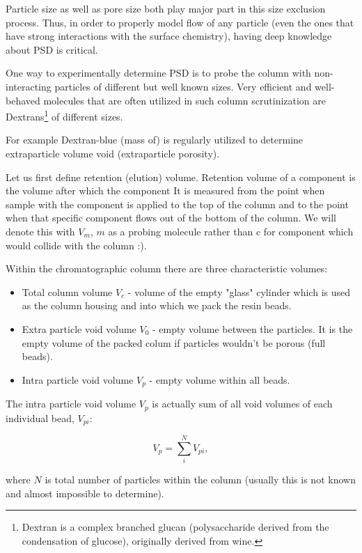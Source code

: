 Particle size as well as pore size both play major part in this size exclusion
process. Thus, in order to properly model flow of any particle (even the ones
that have strong interactions with the surface chemistry), having deep
knowledge about PSD is critical.

One way to experimentally determine PSD is to probe the column with
non-interacting particles of different but well known sizes. Very efficient and
well-behaved molecules that are often utilized in such column scrutinization
are Dextrans\footnote{Dextran is a complex branched glucan (polysaccharide
    derived from the condensation of glucose), originally derived from wine.}
of different sizes.


For example Dextran-blue (mass of) is regularly utilized to determine
extraparticle volume void (extraparticle porosity).

Let us first define retention (elution) volume. Retention volume of a component
is the volume after which the component It is measured from the point when
sample with the component is applied to the top of the column and to the point when that
specific component flows out of the bottom of the column. We will denote this
with $V_m$, $m$ as a probing molecule rather than c for component which would collide
with the column :).

Within the chromatographic column there are three characteristic volumes:

\begin{itemize}
    \item Total column volume $V_c$ - volume of the empty "glass" cylinder which is
          used as the column housing and into which we pack the resin beads.
    \item Extra particle void volume $V_0$ - empty volume between the
          particles. It is the empty volume of the packed colum if particles
          wouldn't be porous (full beads).
    \item Intra particle void volume $V_{p}$ - empty volume within all beads.
\end{itemize}

The intra particle void volume $V_{p}$ is actually sum of all void volumes of
each individual bead, $V_{pi}$:

\[V_p = \sum_{i}^{N}V_{pi},\]

where $N$ is total number of particles within the column (usually this is not
known and almost impossible to determine).


